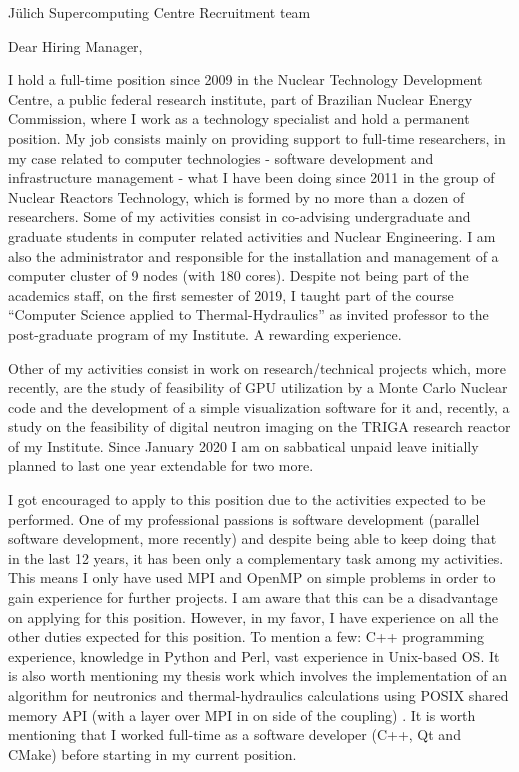\documentclass[11pt]{letter}
\begin{document}
\begin{letter}{Jülich Supercomputing Centre Recruitment team}

  \opening{Dear Hiring Manager,}
  
  I hold a full-time position since 2009 in the Nuclear Technology Development Centre, a public federal
  research institute, part of Brazilian Nuclear Energy Commission, where I work as a technology
  specialist and hold a permanent position. My job consists mainly on
  providing support to full-time researchers, in my case
  related to computer technologies - software development and infrastructure management - what I have been
  doing since 2011 in the group of Nuclear Reactors Technology, which is formed by no more than a dozen of researchers.
  Some of my activities consist in co-advising undergraduate and graduate students in computer related
  activities and Nuclear Engineering. I am also the administrator and responsible for the installation and management of a
  computer cluster of 9 nodes (with 180 cores). Despite not being part of the academics staff, on the first semester of 2019,
  I taught part of the course ``Computer Science applied to Thermal-Hydraulics'' as invited professor to the post-graduate 
  program of my Institute. A rewarding experience.

  Other of my activities consist in work on research/technical projects which, more recently, are the study of
  feasibility of GPU utilization by a Monte Carlo Nuclear code and the development of
  a simple visualization software for it and, recently, a study on the feasibility of digital neutron imaging on
  the TRIGA research reactor of my Institute. Since January 2020 I am on sabbatical unpaid leave initially planned to last one year extendable for two more.

  I got encouraged to apply to this position due to the activities expected to be performed. One of my professional
  passions is software development (parallel software development, more recently) and despite being able to keep doing that in the last 12 years, it has been only a complementary task among my activities. This means I only have used MPI and OpenMP on simple problems in order to gain experience for further projects. I am aware that this can be a disadvantage on applying for this position. However, in my favor, I have experience on all the other duties expected for this position. To mention a few: C++ programming experience, knowledge in Python and Perl, vast experience in Unix-based OS. It is also worth mentioning my thesis work which involves the implementation of an algorithm for neutronics and thermal-hydraulics calculations using POSIX shared memory API (with a layer over MPI in on side of the coupling) . It is worth mentioning that I worked full-time as a software developer (C++, Qt and CMake) before starting in my current position.


\end{letter}
\end{document}
